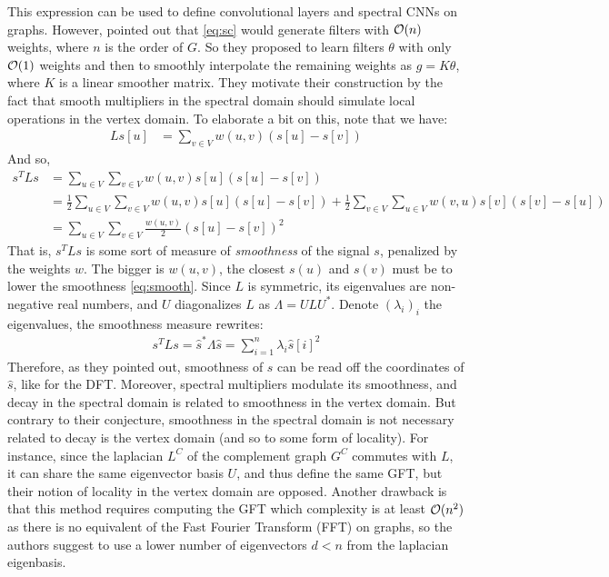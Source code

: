This expression can be used to define convolutional layers and spectral CNNs on graphs. However, \cite{bruna2013spectral} pointed out that \eqref{eq:sc} would generate filters with $\mathcal{O}(n)$ weights, where $n$ is the order of $G$. So they proposed to learn filters $\theta$ with only $\mathcal{O}(1)$ weights and then to smoothly interpolate the remaining weights as $g = K \theta$, where $K$ is a linear smoother matrix. They motivate their construction by the fact that smooth multipliers in the spectral domain should simulate local operations in the vertex domain. To elaborate a bit on this, note that we have:
\begin{align}
Ls[u] &= \displaystyle\sum_{v \in V} w(u,v)(s[u] - s[v])
\end{align}
And so,
\begin{align}
s^TLs &= \displaystyle\sum_{u \in V}\sum_{v \in V} w(u,v)s[u](s[u] - s[v])\nonumber\\
&= \displaystyle \frac{1}2\sum_{u \in V}\sum_{v \in V} w(u,v)s[u](s[u] - s[v]) + \frac{1}2\sum_{v \in V}\sum_{u \in V} w(v,u)s[v](s[v] - s[u])\nonumber\\
&=  \displaystyle\sum_{u \in V}\sum_{v \in V} \frac{w(u,v)}2(s[u] - s[v])^2 \label{eq:smooth}
\end{align}
That is, $s^TLs$ is some sort of measure of \emph{smoothness} of the signal $s$, penalized by the weights $w$. The bigger is $w(u,v)$, the closest $s(u)$ and $s(v)$ must be to lower the smoothness \eqref{eq:smooth}. Since $L$ is symmetric, its eigenvalues are non-negative real numbers, and $U$ diagonalizes $L$ as $\Lambda = ULU^*$. Denote $(\lambda_i)_i$ the eigenvalues, the smoothness measure rewrites:
\begin{align}
s^TLs = \widehat{s}^*\Lambda\widehat{s} = \displaystyle\sum_{i=1}^n \lambda_i \widehat{s}[i]^2
\end{align}
Therefore, as they pointed out, smoothness of $s$ can be read off the coordinates of $\hat{s}$, like for the DFT. Moreover, spectral multipliers modulate its smoothness, and decay in the spectral domain is related to smoothness in the vertex domain. But contrary to their conjecture, smoothness in the spectral domain is not necessary related to decay is the vertex domain (and so to some form of locality). For instance, since the laplacian $L^C$ of the complement graph $G^C$ commutes with $L$, it can share the same eigenvector basis $U$, and thus define the same GFT, but their notion of locality in the vertex domain are opposed. Another drawback is that this method requires computing the GFT which complexity is at least $\mathcal{O}(n^2)$ as there is no equivalent of the Fast Fourier Transform (FFT) on graphs, so the authors suggest to use a lower number of eigenvectors $d < n$ from the laplacian eigenbasis.

